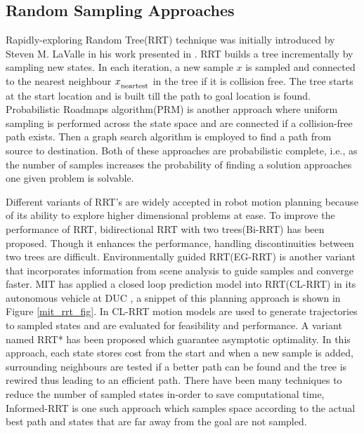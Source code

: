 \subsection{Random Sampling Approaches}
\label{rw_incremental_search}
Rapidly-exploring Random Tree(RRT) technique was initially introduced by Steven M. LaValle in his work presented in \cite{Lavalle_rrt}. RRT builds a tree incrementally by sampling new states. In each iteration, a new sample $x$ is sampled and connected to the nearest neighbour $x_\textsubscript{neartest}$ in the tree if it is collision free. The tree starts at the start location and is built till the path to goal location is found. Probabilistic Roadmaps algorithm\cite{prm}(PRM) is another approach where uniform sampling is performed across the state space and are connected if a collision-free path exists. Then a graph search algorithm is employed to find a path from source to destination. Both of these approaches are probabilistic complete, i.e., as the number of samples increases the probability of finding a solution approaches one given problem is solvable.


Different variants of RRT's are widely accepted in robot motion planning because of its ability to explore higher dimensional problems at ease\cite{rrt_higher_dimension}. To improve the performance of RRT, bidirectional RRT with two trees(Bi-RRT) has been proposed. Though it enhances the performance, handling discontinuities between two trees are difficult\cite{birrt}. Environmentally guided RRT(EG-RRT) is another variant that incorporates information from scene analysis to guide samples and converge faster\cite{egrrt}. MIT has applied a closed loop prediction model into RRT(CL-RRT) in its autonomous vehicle at DUC \cite{mit_rrt}, a snippet of this planning approach is shown in Figure \ref{mit_rrt_fig}. In CL-RRT motion models are used to generate trajectories to sampled states and are evaluated for feasibility and performance. A variant named RRT* \cite{rrt_star} has been proposed which guarantee asymptotic optimality. In this approach, each state stores cost from the start and when a new sample is added, surrounding neighbours are tested if a better path can be found and the tree is rewired thus leading to an efficient path. There have been many techniques to reduce the number of sampled states in-order to save computational time, Informed-RRT \cite{informed_rrt} is one such approach which samples space according to the actual best path and states that are far away from the goal are not sampled.

